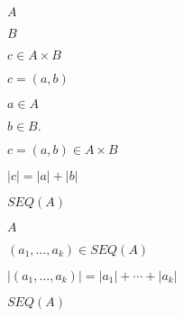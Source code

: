 \documentclass[10pt]{book}
\begin{document}
\begin{mdSnippets}
\begin{mdInlineSnippet}[7fc56270e7a70fa81a5935b72eacbe29]
$A$\end{mdInlineSnippet}%
\begin{mdInlineSnippet}%
$B$\end{mdInlineSnippet}%
\begin{mdInlineSnippet}[7a381d436832fead188f4481d2235fb6]%
$c\in A\times B$\end{mdInlineSnippet}%
\begin{mdInlineSnippet}[d6ef0f98312ac5ec655fae115532ce14]%
$c = (a,b)$\end{mdInlineSnippet}%
\begin{mdInlineSnippet}[186d877666fa2c6f92794b782c19456a]%
$a\in A$\end{mdInlineSnippet}%
\begin{mdInlineSnippet}[89f46eecb6b02f2bb64e544df4251247]%
$b\in B.$\end{mdInlineSnippet}%
\begin{mdInlineSnippet}[d85c1b0673721de53a71b0624ebf7096]%
$c=(a,b)\in A\times B$\end{mdInlineSnippet}%
\begin{mdInlineSnippet}[5bfd6ae953cc5361679d57a6d2115176]%
$|c|=|a|+|b|$\end{mdInlineSnippet}%
\begin{mdInlineSnippet}%
$SEQ(A)$\end{mdInlineSnippet}%
\begin{mdInlineSnippet}[7fc56270e7a70fa81a5935b72eacbe29]%
$A$\end{mdInlineSnippet}%
\begin{mdInlineSnippet}%
$(a_1,\ldots,a_k)\in SEQ(A)$\end{mdInlineSnippet}%
\begin{mdInlineSnippet}[e2faed63a4e3ee2b569354b9a51cc2f5]%
$|(a_1,\ldots,a_k)|=|a_1|+\cdots+|a_k|$\end{mdInlineSnippet}%
\begin{mdInlineSnippet}%
$SEQ(A)$\end{mdInlineSnippet}%
\begin{mdInlineSnippet}%

\end{mdInlineSnippet}
\end{mdSnippets}
\end{document}
